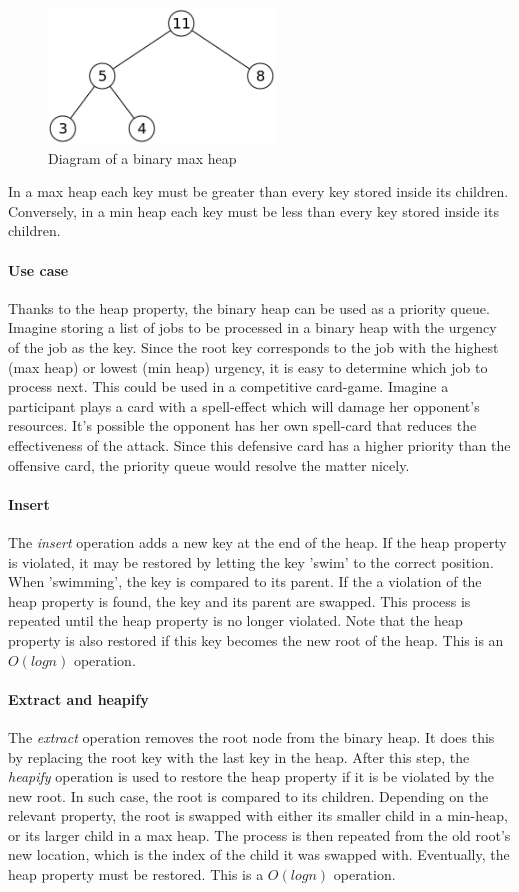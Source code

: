 \documentclass{article}
\begin{document}
\begin{figure}[H]
  \centering
  \includegraphics[width=6cm]{binary_heap}
  \caption{Diagram of a binary max heap}
\end{figure}

In a max heap each key must be greater than every key stored inside its children.
Conversely, in a min heap each key must be less than every key stored inside its children.

\paragraph{Use case}
Thanks to the heap property, the binary heap can be used as a priority queue. Imagine storing a list of jobs to be processed
in a binary heap with the urgency of the job as the key. Since the root key corresponds to the job with the highest (max heap)
or lowest (min heap) urgency, it is easy to determine which job to process next. This could be used in a competitive card-game.
Imagine a participant plays a card with a spell-effect which will damage her opponent's resources. It's possible the opponent
has her own spell-card that reduces the effectiveness of the attack. Since this defensive card has a higher priority than the
offensive card, the priority queue would resolve the matter nicely.

\paragraph{Insert}
The {\em insert} operation adds a new key at the end of the heap. If the heap property is violated,
it may be restored by letting the key 'swim' to the correct position. When 'swimming', the key
is compared to its parent. If the a violation of the heap property is found, the key and its parent
are swapped. This process is repeated until the heap property is no longer violated. Note that the
heap property is also restored if this key becomes the new root of the heap. This is an \(O(log n)\)
operation.

\paragraph{Extract and heapify}
The {\em extract} operation removes the root node from the binary heap. It does this by replacing
the root key with the last key in the heap. After this step, the {\em heapify} operation is used to
restore the heap property if it is be violated by the new root. In such case, the root is compared
to its children. Depending on the relevant property, the root is swapped with either its smaller child in a
min-heap, or its larger child in a max heap. The process is then repeated from the old root's new location,
which is the index of the child it was swapped with. Eventually, the heap property must be restored.
This is a \(O(log n)\) operation.
\end{document}
